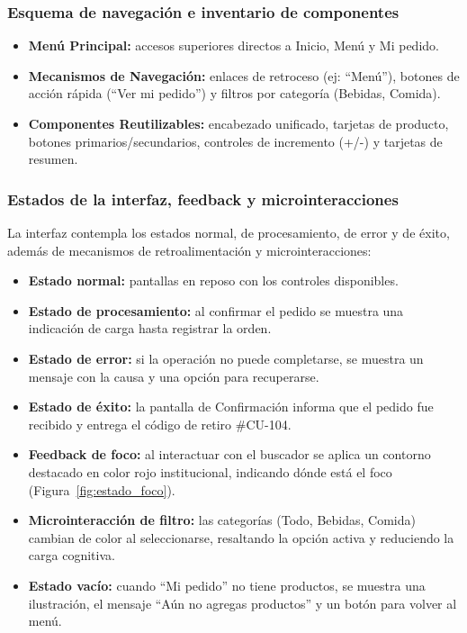 \documentclass{article}
\begin{document}
\subsubsection{Esquema de navegación e inventario de componentes}
\begin{itemize}[leftmargin=1.5em, itemsep=3pt]
    \item \textbf{Menú Principal:} accesos superiores directos a Inicio, Menú y Mi pedido.
    \item \textbf{Mecanismos de Navegación:} enlaces de retroceso (ej: ``Menú''), botones de acción rápida (``Ver mi pedido'') y filtros por categoría (Bebidas, Comida).
    \item \textbf{Componentes Reutilizables:} encabezado unificado, tarjetas de producto, botones primarios/secundarios, controles de incremento (+/-) y tarjetas de resumen.
\end{itemize}

\subsubsection{Estados de la interfaz, feedback y microinteracciones}
La interfaz contempla los estados normal, de procesamiento, de error y de éxito, además de mecanismos de retroalimentación y microinteracciones:
\begin{itemize}[leftmargin=1.5em, itemsep=3pt]
    \item \textbf{Estado normal:} pantallas en reposo con los controles disponibles.
    \item \textbf{Estado de procesamiento:} al confirmar el pedido se muestra una indicación de carga hasta registrar la orden.
    \item \textbf{Estado de error:} si la operación no puede completarse, se muestra un mensaje con la causa y una opción para recuperarse.
    \item \textbf{Estado de éxito:} la pantalla de Confirmación informa que el pedido fue recibido y entrega el código de retiro \#CU-104.
    \item \textbf{Feedback de foco:} al interactuar con el buscador se aplica un contorno destacado en color rojo institucional, indicando dónde está el foco (Figura~\ref{fig:estado_foco}).
    \item \textbf{Microinteracción de filtro:} las categorías (Todo, Bebidas, Comida) cambian de color al seleccionarse, resaltando la opción activa y reduciendo la carga cognitiva.
    \item \textbf{Estado vacío:} cuando ``Mi pedido'' no tiene productos, se muestra una ilustración, el mensaje ``Aún no agregas productos'' y un botón para volver al menú.
\end{itemize}
\end{document}
